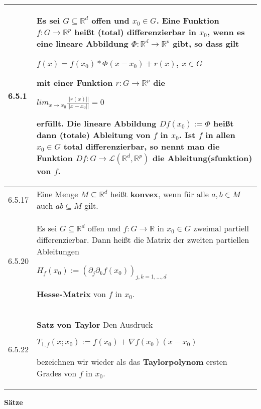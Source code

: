     \begin{longtable}{p{1cm} p{16cm}}
        \toprule

        6.5.1 & Es sei $G \subseteq \mathbb{R}^d$ offen und $x_0 \in G$. Eine Funktion $f: G \rightarrow \mathbb{R}^p$ heißt
                \textbf{(total) differenzierbar} in $x_0$, wenn es eine lineare Abbildung $\Phi: \mathbb{R}^d \rightarrow \mathbb{R}^p$
                gibt, so dass gilt \hfill \break
                \centerline{$ f(x) = f(x_0) * \Phi(x-x_0) + r(x)$, $x \in G$}
                mit einer Funktion $r: G \rightarrow \mathbb{R}^p$ die \hfill \break
                \centerline{$ lim_{x \rightarrow x_0} \frac{||r(x)||}{||x-x_0||} = 0 $}
                erfüllt. \hfill \break
                Die lineare Abbildung $Df(x_0) := \Phi$ heißt dann \textbf{(totale) Ableitung} von $f$ in $x_0$. Ist $f$ in allen
                $x_0 \in G$ total differenzierbar, so nennt man die Funktion $Df: G \rightarrow \mathcal{L}(\mathbb{R}^d, \mathbb{R}^p)$
                die \textbf{Ableitung(sfunktion)} von $f$. \\
        \midrule
        6.5.17& Eine Menge $M \subseteq \mathbb{R}^d$ heißt \textbf{konvex}, wenn für alle $a,b \in M$ auch $\bar{ab} \subseteq M$ gilt. \\
        \midrule
        6.5.20& Es sei $G \subseteq \mathbb{R}^d$ offen und $f: G \rightarrow \mathbb{R}$ in $x_0 \in G$ zweimal partiell differenzierbar.
                Dann heißt die Matrix der zweiten partiellen Ableitungen \hfill \break
                \centerline{$ H_f(x_0) := (\partial_j \partial_k f(x_0))_{j,k = 1,\dots,d} $}
                \textbf{Hesse-Matrix} von $f$ in $x_0$. \\
        6.5.22& \textbf{Satz von Taylor} \hfill \break
                Den Ausdruck \hfill \break
                \centerline{$ T_{1,f}(x;x_0) := f(x_0) + \nabla f(x_0)(x-x_0) $}
                bezeichnen wir wieder als das \textbf{Taylorpolynom} ersten Grades von $f$ in $x_0$. \\

        \bottomrule

    \end{longtable}
    

    

    \noindent 
    \textbf{Sätze}
    
